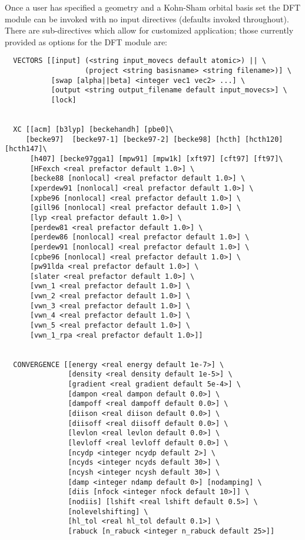 Once a user has specified a geometry and a Kohn-Sham orbital basis set
the DFT module can be invoked with no input directives (defaults 
invoked throughout).  There are sub-directives which allow for 
customized application; those currently provided as options for 
the DFT module are:
\begin{verbatim}
  VECTORS [[input] (<string input_movecs default atomic>) || \
                   (project <string basisname> <string filename>)] \
           [swap [alpha||beta] <integer vec1 vec2> ...] \
           [output <string output_filename default input_movecs>] \
           [lock]


  XC [[acm] [b3lyp] [beckehandh] [pbe0]\
     [becke97]  [becke97-1] [becke97-2] [becke98] [hcth] [hcth120] [hcth147]\
      [h407] [becke97gga1] [mpw91] [mpw1k] [xft97] [cft97] [ft97]\
      [HFexch <real prefactor default 1.0>] \
      [becke88 [nonlocal] <real prefactor default 1.0>] \
      [xperdew91 [nonlocal] <real prefactor default 1.0>] \
      [xpbe96 [nonlocal] <real prefactor default 1.0>] \
      [gill96 [nonlocal] <real prefactor default 1.0>] \
      [lyp <real prefactor default 1.0>] \
      [perdew81 <real prefactor default 1.0>] \
      [perdew86 [nonlocal] <real prefactor default 1.0>] \
      [perdew91 [nonlocal] <real prefactor default 1.0>] \
      [cpbe96 [nonlocal] <real prefactor default 1.0>] \
      [pw91lda <real prefactor default 1.0>] \
      [slater <real prefactor default 1.0>] \
      [vwn_1 <real prefactor default 1.0>] \
      [vwn_2 <real prefactor default 1.0>] \
      [vwn_3 <real prefactor default 1.0>] \
      [vwn_4 <real prefactor default 1.0>] \
      [vwn_5 <real prefactor default 1.0>] \
      [vwn_1_rpa <real prefactor default 1.0>]]


  CONVERGENCE [[energy <real energy default 1e-7>] \
               [density <real density default 1e-5>] \
               [gradient <real gradient default 5e-4>] \
               [dampon <real dampon default 0.0>] \
               [dampoff <real dampoff default 0.0>] \
               [diison <real diison default 0.0>] \
               [diisoff <real diisoff default 0.0>] \
               [levlon <real levlon default 0.0>] \
               [levloff <real levloff default 0.0>] \
               [ncydp <integer ncydp default 2>] \
               [ncyds <integer ncyds default 30>] \
               [ncysh <integer ncysh default 30>] \
               [damp <integer ndamp default 0>] [nodamping] \
               [diis [nfock <integer nfock default 10>]] \
               [nodiis] [lshift <real lshift default 0.5>] \
               [nolevelshifting] \
               [hl_tol <real hl_tol default 0.1>] \
               [rabuck [n_rabuck <integer n_rabuck default 25>]]



\end{verbatim}
